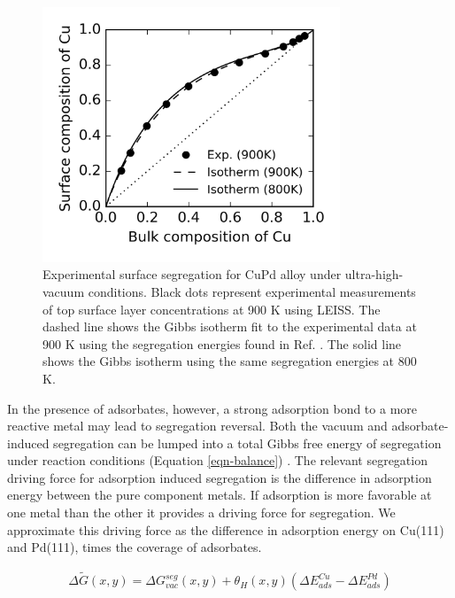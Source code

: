 \documentclass[12pt,oneside]{cmuthesis}
\begin{document}
\begin{figure}[h]
\centering
\includegraphics[width=3.5in]{./images/segvac.png}
\caption{Experimental surface segregation for CuPd alloy under ultra-high-vacuum conditions. Black dots represent experimental measurements of top surface layer concentrations at 900 K using LEISS. The dashed line shows the Gibbs isotherm fit to the experimental data at 900 K using the segregation energies found in Ref. . The solid line shows the Gibbs isotherm using the same segregation energies at 800 K. \label{fig:exp-seg}}
\end{figure}

In the presence of adsorbates, however, a strong adsorption bond to a more reactive metal may lead to segregation reversal. Both the vacuum and adsorbate-induced segregation can be lumped into a total Gibbs free energy of segregation under reaction conditions (Equation \eqref{eqn-balance}) \cite{kitchin-2008-alloy,miller-2008-effec-adsor}. The relevant segregation driving force for adsorption induced segregation is the difference in adsorption energy between the pure component metals. If adsorption is more favorable at one metal than the other it provides a driving force for segregation. We approximate this driving force as the difference in adsorption energy on Cu(111) and Pd(111), times the coverage of adsorbates.

\begin{eqnarray}
\Delta \widetilde{G} (x,y) = \Delta G^{seg}_{vac} (x,y) + \theta_{H} (x,y) \left(\Delta E^{Cu}_{ads} - \Delta E^{Pd}_{ads}\right)
\label{eqn-balance}
\end{eqnarray}
\end{document}
